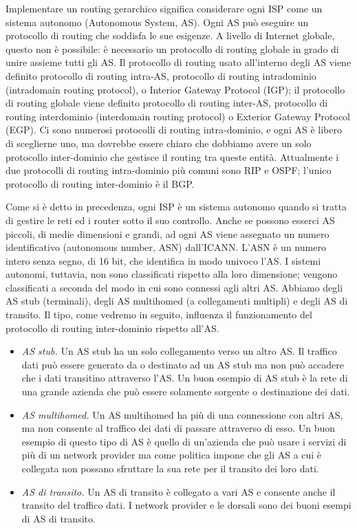 Implementare un routing gerarchico significa considerare ogni ISP come un sistema autonomo (Autonomous System, AS). Ogni AS può eseguire un protocollo di routing che soddisfa le sue esigenze. A livello di Internet globale, questo non è possibile: è necessario un protocollo di routing globale in grado di unire assieme tutti gli AS. Il protocollo di routing usato all'interno degli AS viene definito protocollo di routing intra-AS, protocollo di routing intradominio (intradomain routing protocol), o Interior Gateway Protocol (IGP); il protocollo di routing globale viene definito protocollo di routing inter-AS, protocollo di routing interdominio (interdomain routing protocol) o Exterior Gateway Protocol (EGP). Ci sono numerosi protocolli di routing intra-dominio, e ogni AS è libero di sceglierne uno, ma dovrebbe essere chiaro che dobbiamo avere un solo protocollo inter-dominio che gestisce il routing tra queste entità. Attualmente i due protocolli di routing intra-dominio più comuni sono RIP e OSPF; l'unico protocollo di routing inter-dominio è il BGP.

Come si è detto in precedenza, ogni ISP è un sistema autonomo quando si tratta di gestire le reti ed i router sotto il suo controllo. Anche se possono esserci AS piccoli, di medie dimensioni e grandi, ad ogni AS viene assegnato un numero identificativo (autonomous number, ASN) dall'ICANN. L'ASN è un numero intero senza segno, di 16 bit, che identifica in modo univoco l'AS. I sistemi autonomi, tuttavia, non sono classificati rispetto alla loro dimensione; vengono classificati a seconda del modo in cui sono connessi agli altri AS. Abbiamo degli AS stub (terminali), degli AS multihomed (a collegamenti multipli) e degli AS di transito. Il tipo, come vedremo in seguito, influenza il funzionamento del protocollo di routing inter-dominio rispetto all'AS.

\begin{itemize}
    \item \textit{AS stub.} Un AS stub ha un solo collegamento verso un altro AS. Il traffico dati può essere generato da o destinato ad un AS stub ma non può accadere che i dati transitino attraverso l'AS. Un buon esempio di AS stub è la rete di una grande azienda che può essere solamente sorgente o destinazione dei dati.
    \item \textit{AS multihomed.} Un AS multihomed ha più di una connessione con altri AS, ma non consente al traffico dei dati di passare attraverso di esso. Un buon esempio di questo tipo di AS è quello di un'azienda che può usare i servizi di più di un network provider ma come politica impone che gli AS a cui è collegata non possano sfruttare la sua rete per il transito dei loro dati.
    \item \textit{AS di transito.} Un AS di transito è collegato a vari AS e consente anche il transito del traffico dati. I network provider e le dorsali sono dei buoni esempi di AS di transito.
\end{itemize}

